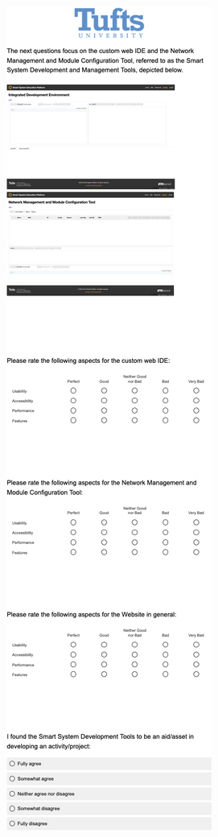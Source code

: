 \begin{multicols}{2}
\newpage
\includegraphics[width=.75\linewidth]{overleaf/images/q7.png}\\

\end{multicols}
